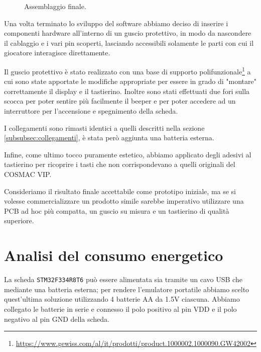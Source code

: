 \documentclass[a4paper]{article}
\begin{document}
\begin{figure}[h!t]
\begin{center}
    \end{center}
    \caption{Assemblaggio finale.}
    \label{fig:assemblaggio}
\end{figure}

Una volta terminato lo sviluppo del software abbiamo deciso di inserire i componenti hardware
all'interno di un guscio protettivo, in modo da nascondere il cablaggio e i vari pin scoperti,
lasciando accessibili solamente le parti con cui il giocatore interagisce direttamente.

Il guscio protettivo è stato realizzato con una base di supporto
polifunzionale\footnote{\url{https://www.gewiss.com/al/it/prodotti/product.1000002.1000090.GW42002}}
a cui sono state apportate le modifiche appropriate per essere in grado di "montare" correttamente
il display e il tastierino. Inoltre sono stati effettuati due fori sulla scocca per poter sentire
più facilmente il beeper e per poter accedere ad un interruttore per l'accensione e spegnimento
della scheda.

I collegamenti sono rimasti identici a quelli descritti nella sezione
\ref{subsubsec:collegamenti}, è stata però aggiunta una batteria esterna.

Infine, come ultimo tocco puramente estetico, abbiamo applicato degli adesivi al tastierino
per ricoprire i tasti che non corrispondevano a quelli originali del COSMAC VIP.

Consideriamo il risultato finale accettabile come prototipo iniziale, ma se si volesse
commercializzare un prodotto simile sarebbe imperativo utilizzare una PCB ad hoc più compatta,
un guscio su misura e un tastierino di qualità superiore.

\section{Analisi del consumo energetico} %

La scheda \texttt{STM32F334R8T6} può essere alimentata sia tramite un cavo USB che mediante
una batteria esterna; per rendere l'emulatore portatile abbiamo scelto quest'ultima
soluzione utilizzando 4 batterie AA da 1.5V ciascuna. Abbiamo collegato le batterie in
serie e connesso il polo positivo al pin VDD e il polo negativo al pin GND della scheda.

%
\end{document}
